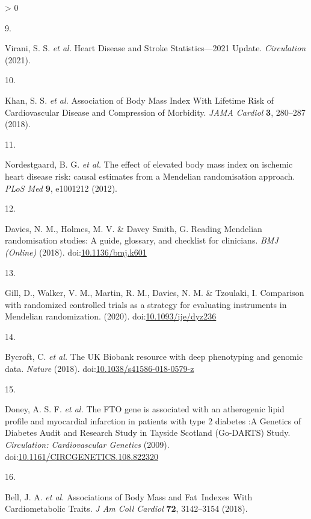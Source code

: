 \documentclass[11pt,twoside]{bristolthesis}
\newlength{\cslhangindent}
\newlength{\csllabelwidth}
\newenvironment{CSLReferences}[2] %
 {%
  \setlength{\parindent}{0pt}
  \ifodd #1 \everypar{\setlength{\hangindent}{\cslhangindent}}\ignorespaces\fi
  \ifnum #2 > 0
  \setlength{\parskip}{#2\baselineskip}
  \fi
 }%
 {}
\newcommand{\CSLLeftMargin}[1]{\parbox[t]{\csllabelwidth}{#1}}
\newcommand{\CSLRightInline}[1]{\parbox[t]{\linewidth - \csllabelwidth}{#1}\break}
\begin{document}
\begin{CSLReferences}{0}{0}
\leavevmode\hypertarget{ref-Virani2021}{}%
\CSLLeftMargin{9. }
\CSLRightInline{Virani, S. S. \emph{et al.} {Heart Disease and Stroke Statistics---2021 Update}. \emph{Circulation} (2021).}

\leavevmode\hypertarget{ref-Khan2018}{}%
\CSLLeftMargin{10. }
\CSLRightInline{Khan, S. S. \emph{et al.} {Association of Body Mass Index With Lifetime Risk of Cardiovascular Disease and Compression of Morbidity}. \emph{JAMA Cardiol} \textbf{3}, 280--287 (2018).}

\leavevmode\hypertarget{ref-Nordestgaard2012}{}%
\CSLLeftMargin{11. }
\CSLRightInline{Nordestgaard, B. G. \emph{et al.} {The effect of elevated body mass index on ischemic heart disease risk: causal estimates from a Mendelian randomisation approach}. \emph{PLoS Med} \textbf{9}, e1001212 (2012).}

\leavevmode\hypertarget{ref-Davies2018}{}%
\CSLLeftMargin{12. }
\CSLRightInline{Davies, N. M., Holmes, M. V. \& Davey Smith, G. {Reading Mendelian randomisation studies: A guide, glossary, and checklist for clinicians}. \emph{BMJ (Online)} (2018). doi:\href{https://doi.org/10.1136/bmj.k601}{10.1136/bmj.k601}}

\leavevmode\hypertarget{ref-Gill2020}{}%
\CSLLeftMargin{13. }
\CSLRightInline{Gill, D., Walker, V. M., Martin, R. M., Davies, N. M. \& Tzoulaki, I. {Comparison with randomized controlled trials as a strategy for evaluating instruments in Mendelian randomization}. (2020). doi:\href{https://doi.org/10.1093/ije/dyz236}{10.1093/ije/dyz236}}

\leavevmode\hypertarget{ref-Bycroft2018}{}%
\CSLLeftMargin{14. }
\CSLRightInline{Bycroft, C. \emph{et al.} {The UK Biobank resource with deep phenotyping and genomic data}. \emph{Nature} (2018). doi:\href{https://doi.org/10.1038/s41586-018-0579-z}{10.1038/s41586-018-0579-z}}

\leavevmode\hypertarget{ref-Doney2009}{}%
\CSLLeftMargin{15. }
\CSLRightInline{Doney, A. S. F. \emph{et al.} {The FTO gene is associated with an atherogenic lipid profile and myocardial infarction in patients with type 2 diabetes :A Genetics of Diabetes Audit and Research Study in Tayside Scotland (Go-DARTS) Study}. \emph{Circulation: Cardiovascular Genetics} (2009). doi:\href{https://doi.org/10.1161/CIRCGENETICS.108.822320}{10.1161/CIRCGENETICS.108.822320}}

\leavevmode\hypertarget{ref-Bell2018}{}%
\CSLLeftMargin{16. }
\CSLRightInline{Bell, J. A. \emph{et al.} {Associations of Body Mass and Fat~Indexes~With Cardiometabolic Traits}. \emph{J Am Coll Cardiol} \textbf{72}, 3142--3154 (2018).}


\end{CSLReferences}
\end{document}
